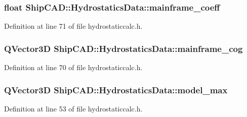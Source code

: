 \subsubsection[{\texorpdfstring{mainframe\+\_\+coeff}{mainframe_coeff}}]{\setlength{\rightskip}{0pt plus 5cm}float Ship\+C\+A\+D\+::\+Hydrostatics\+Data\+::mainframe\+\_\+coeff}\hypertarget{structShipCAD_1_1HydrostaticsData_a4208b97fe6110516d71e67708186897a}{}\label{structShipCAD_1_1HydrostaticsData_a4208b97fe6110516d71e67708186897a}


Definition at line 71 of file hydrostaticcalc.\+h.

\subsubsection[{\texorpdfstring{mainframe\+\_\+cog}{mainframe_cog}}]{\setlength{\rightskip}{0pt plus 5cm}Q\+Vector3D Ship\+C\+A\+D\+::\+Hydrostatics\+Data\+::mainframe\+\_\+cog}\hypertarget{structShipCAD_1_1HydrostaticsData_ab726ebe5c185d197a25e4477576266a4}{}\label{structShipCAD_1_1HydrostaticsData_ab726ebe5c185d197a25e4477576266a4}


Definition at line 70 of file hydrostaticcalc.\+h.

\subsubsection[{\texorpdfstring{model\+\_\+max}{model_max}}]{\setlength{\rightskip}{0pt plus 5cm}Q\+Vector3D Ship\+C\+A\+D\+::\+Hydrostatics\+Data\+::model\+\_\+max}\hypertarget{structShipCAD_1_1HydrostaticsData_a9319fb2ad054a595b6e3b3fd4059a3ae}{}\label{structShipCAD_1_1HydrostaticsData_a9319fb2ad054a595b6e3b3fd4059a3ae}


Definition at line 53 of file hydrostaticcalc.\+h.

